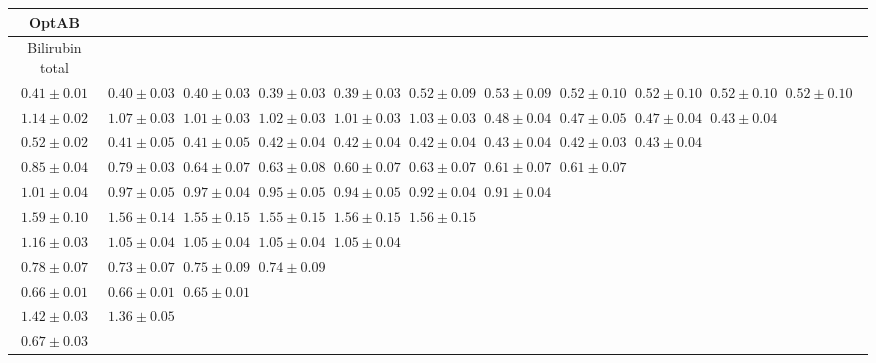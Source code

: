 \begin{table}[ht]
{{\begin{adjustbox}{width=\textwidth}
\begin{tabular}{cccccccccccc}
\hline
OptAB &  &  &  &  &  &  &  &  &  & \\
\hline
Bilirubin total &  &  &  &  &  &  &  &  &  & \\
\hline
$0.41 \pm 0.01$ & $0.40 \pm 0.03$ & $0.40 \pm 0.03$ & $0.39 \pm 0.03$ & $0.39 \pm 0.03$ & $0.52 \pm 0.09$ & $0.53 \pm 0.09$ & $0.52 \pm 0.10$ & $0.52 \pm 0.10$ & $0.52 \pm 0.10$ & $0.52 \pm 0.10$ &  \\
$1.14 \pm 0.02$ & $1.07 \pm 0.03$ & $1.01 \pm 0.03$ & $1.02 \pm 0.03$ & $1.01 \pm 0.03$ & $1.03 \pm 0.03$ & $0.48 \pm 0.04$ & $0.47 \pm 0.05$ & $0.47 \pm 0.04$ & $0.43 \pm 0.04$ &  &  \\
$0.52 \pm 0.02$ & $0.41 \pm 0.05$ & $0.41 \pm 0.05$ & $0.42 \pm 0.04$ & $0.42 \pm 0.04$ & $0.42 \pm 0.04$ & $0.43 \pm 0.04$ & $0.42 \pm 0.03$ & $0.43 \pm 0.04$ &  &  &  \\
$0.85 \pm 0.04$ & $0.79 \pm 0.03$ & $0.64 \pm 0.07$ & $0.63 \pm 0.08$ & $0.60 \pm 0.07$ & $0.63 \pm 0.07$ & $0.61 \pm 0.07$ & $0.61 \pm 0.07$ &  &  &  &  \\
$1.01 \pm 0.04$ & $0.97 \pm 0.05$ & $0.97 \pm 0.04$ & $0.95 \pm 0.05$ & $0.94 \pm 0.05$ & $0.92 \pm 0.04$ & $0.91 \pm 0.04$ &  &  &  &  &  \\
$1.59 \pm 0.10$ & $1.56 \pm 0.14$ & $1.55 \pm 0.15$ & $1.55 \pm 0.15$ & $1.56 \pm 0.15$ & $1.56 \pm 0.15$ &  &  &  &  &  &  \\
$1.16 \pm 0.03$ & $1.05 \pm 0.04$ & $1.05 \pm 0.04$ & $1.05 \pm 0.04$ & $1.05 \pm 0.04$ &  &  &  &  &  &  &  \\
$0.78 \pm 0.07$ & $0.73 \pm 0.07$ & $0.75 \pm 0.09$ & $0.74 \pm 0.09$ &  &  &  &  &  &  &  &  \\
$0.66 \pm 0.01$ & $0.66 \pm 0.01$ & $0.65 \pm 0.01$ &  &  &  &  &  &  &  &  &  \\
$1.42 \pm 0.03$ & $1.36 \pm 0.05$ &  &  &  &  &  &  &  &  &  &  \\
$0.67 \pm 0.03$ &  &  &  &  &  &  &  &  &  &  &  \\


\end{tabular}
\end{adjustbox}}}
\end{table}
